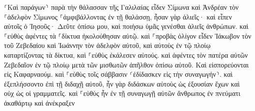 \documentclass{openreader}
\begin{document}
⸂Καὶ παράγων⸃ παρὰ τὴν θάλασσαν τῆς Γαλιλαίας εἶδεν Σίμωνα καὶ Ἀνδρέαν τὸν ⸀ἀδελφὸν Σίμωνος ⸀ἀμφιβάλλοντας ἐν τῇ θαλάσσῃ, ἦσαν γὰρ ἁλιεῖς· 
καὶ εἶπεν αὐτοῖς ὁ Ἰησοῦς· Δεῦτε ὀπίσω μου, καὶ ποιήσω ὑμᾶς γενέσθαι ἁλιεῖς ἀνθρώπων. 
καὶ ⸀εὐθὺς ἀφέντες τὰ ⸀δίκτυα ἠκολούθησαν αὐτῷ. 
καὶ ⸀προβὰς ὀλίγον εἶδεν Ἰάκωβον τὸν τοῦ Ζεβεδαίου καὶ Ἰωάννην τὸν ἀδελφὸν αὐτοῦ, καὶ αὐτοὺς ἐν τῷ πλοίῳ καταρτίζοντας τὰ δίκτυα, 
καὶ ⸀εὐθὺς ἐκάλεσεν αὐτούς. καὶ ἀφέντες τὸν πατέρα αὐτῶν Ζεβεδαῖον ἐν τῷ πλοίῳ μετὰ τῶν μισθωτῶν ἀπῆλθον ὀπίσω αὐτοῦ. 
Καὶ εἰσπορεύονται εἰς Καφαρναούμ. καὶ ⸀εὐθὺς τοῖς σάββασιν ⸂ἐδίδασκεν εἰς τὴν συναγωγήν⸃. 
καὶ ἐξεπλήσσοντο ἐπὶ τῇ διδαχῇ αὐτοῦ, ἦν γὰρ διδάσκων αὐτοὺς ὡς ἐξουσίαν ἔχων καὶ οὐχ ὡς οἱ γραμματεῖς. 
καὶ ⸀εὐθὺς ἦν ἐν τῇ συναγωγῇ αὐτῶν ἄνθρωπος ἐν πνεύματι ἀκαθάρτῳ καὶ ἀνέκραξεν 
\end{document}
